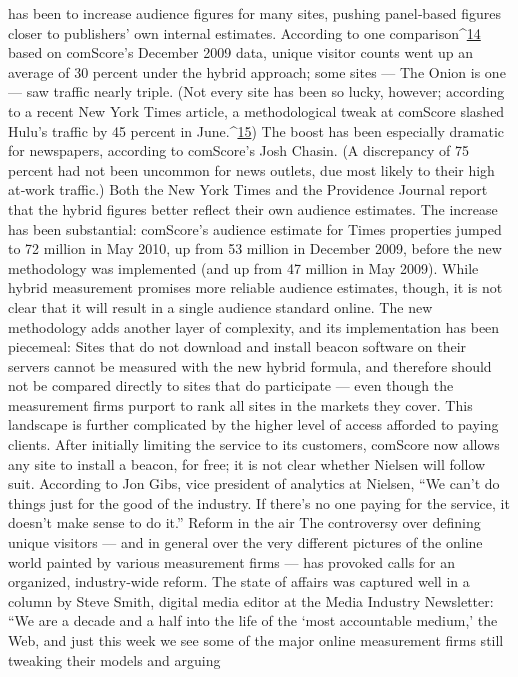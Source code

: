 has been to increase audience figures for many sites, pushing panel‐based
figures closer to publishers’ own internal estimates. According to one
comparison^{\href{#endnotes}{14}} based on comScore’s December 2009 data, unique visitor
counts went up an average of 30 percent under the hybrid approach; some
sites — The Onion is one — saw traffic nearly triple. (Not every site has
been so lucky, however; according to a recent New York Times article, a
methodological tweak at comScore slashed Hulu’s traffic by 45 percent in
June.^{\href{#endnotes}{15}})
The boost has been especially dramatic for newspapers, according to
comScore’s Josh Chasin. (A discrepancy of 75 percent had not been
uncommon for news outlets, due most likely to their high at‐work traffic.)
Both the New York Times and the Providence Journal report that the hybrid
figures better reflect their own audience estimates. The increase has been
substantial: comScore’s audience estimate for Times properties jumped to
72 million in May 2010, up from 53 million in December 2009, before the
new methodology was implemented (and up from 47 million in May
2009).
While hybrid measurement promises more reliable audience estimates,
though, it is not clear that it will result in a single audience standard
online. The new methodology adds another layer of complexity, and its
implementation has been piecemeal: Sites that do not download and
install beacon software on their servers cannot be measured with the new
hybrid formula, and therefore should not be compared directly to sites
that do participate — even though the measurement firms purport to rank
all sites in the markets they cover.
This landscape is further complicated by the higher level of access
afforded to paying clients. After initially limiting the service to its
customers, comScore now allows any site to install a beacon, for free; it is
not clear whether Nielsen will follow suit. According to Jon Gibs, vice
president of analytics at Nielsen, ``We can’t do things just for the good of
the industry. If there’s no one paying for the service, it doesn’t make sense
to do it.''
Reform in the air
The controversy over defining unique visitors — and in general over the
very different pictures of the online world painted by various
measurement firms — has provoked calls for an organized, industry‐wide
reform. The state of affairs was captured well in a column by Steve Smith,
digital media editor at the Media Industry Newsletter:
``We are a decade and a half into the life of the ‘most accountable
medium,’ the Web, and just this week we see some of the major
online measurement firms still tweaking their models and arguing
